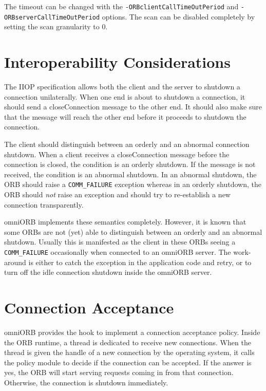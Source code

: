 \documentclass[11pt,twoside,a4paper]{book}
\newcommand{\code}[1]{\texttt{#1}}
\begin{document}
The timeout can be changed with the
\texttt{-ORBclientCallTimeOutPeriod} and
\texttt{-ORBserverCallTimeOutPeriod} options. The scan can be disabled
completely by setting the scan granularity to 0.

\section{Interoperability Considerations}

The IIOP specification allows both the client and the server to
shutdown a connection unilaterally. When one end is about to shutdown
a connection, it should send a closeConnection message to the other
end. It should also make sure that the message will reach the other
end before it proceeds to shutdown the connection.

The client should distinguish between an orderly and an abnormal
connection shutdown. When a client receives a closeConnection message
before the connection is closed, the condition is an orderly shutdown.
If the message is not received, the condition is an abnormal shutdown.
In an abnormal shutdown, the ORB should raise a \code{COMM\_FAILURE}
exception whereas in an orderly shutdown, the ORB should \emph{not}
raise an exception and should try to re-establish a new connection
transparently.

omniORB implements these semantics completely. However, it is known
that some ORBs are not (yet) able to distinguish between an orderly
and an abnormal shutdown. Usually this is manifested as the client in
these ORBs seeing a \code{COMM\_FAILURE} occasionally when connected
to an omniORB server. The work-around is either to catch the exception
in the application code and retry, or to turn off the idle connection
shutdown inside the omniORB server.


\section{Connection Acceptance}
\label{sec:accept}

omniORB provides the hook to implement a connection acceptance policy.
Inside the ORB runtime, a thread is dedicated to receive new
connections. When the thread is given the handle of a new connection
by the operating system, it calls the policy module to decide if the
connection can be accepted. If the answer is yes, the ORB will start
serving requests coming in from that connection. Otherwise, the
connection is shutdown immediately.
\end{document}
